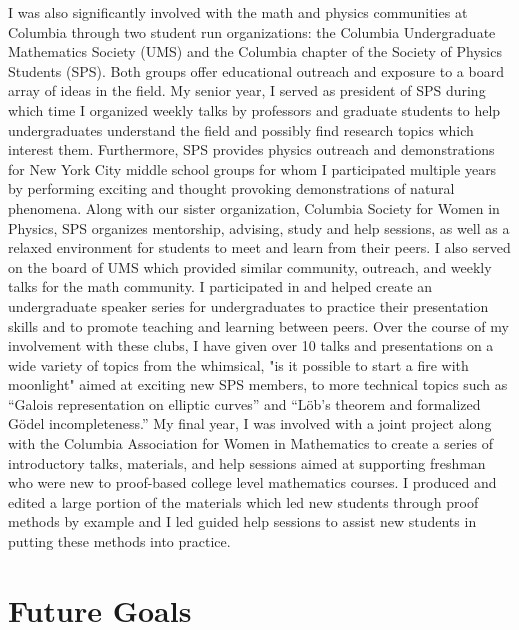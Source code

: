 \documentclass[11pt]{amsart}
\begin{document}
I was also significantly involved with the math and physics communities at Columbia through two student run organizations: the Columbia Undergraduate Mathematics Society (UMS) and the Columbia chapter of the Society of Physics Students (SPS). Both groups offer educational outreach and exposure to a board array of ideas in the field. My senior year, I served as president of SPS during which time I organized weekly talks by professors and graduate students to help undergraduates understand the field and possibly find research topics which interest them. Furthermore, SPS provides physics outreach and demonstrations for New York City middle school groups for whom I participated multiple years by performing exciting and thought provoking demonstrations of natural phenomena. Along with our sister organization, Columbia Society for Women in Physics, SPS organizes mentorship, advising, study and help sessions, as well as a relaxed environment for students to meet and learn from their peers. I also served on the board of UMS which provided similar community, outreach, and weekly talks for the math community. I participated in and helped create an undergraduate speaker series for undergraduates to practice their presentation skills and to promote teaching and learning between peers. Over the course of my involvement with these clubs, I have given over 10 talks and presentations on a wide variety of topics from the whimsical, "is it possible to start a fire with moonlight" aimed at exciting new SPS members, to more technical topics such as ``Galois representation on elliptic curves'' and 		``L\"{o}b's theorem and formalized G\"{o}del incompleteness.'' My final year, I was involved with a joint project along with the Columbia Association for Women in Mathematics to create a series of introductory talks, materials, and help sessions aimed at supporting freshman who were new to proof-based college level mathematics courses. I produced and edited a large portion of the materials which led new students through proof methods by example and I led guided help sessions to assist new students in putting these methods into practice.

\section*{Future Goals}
\end{document}
